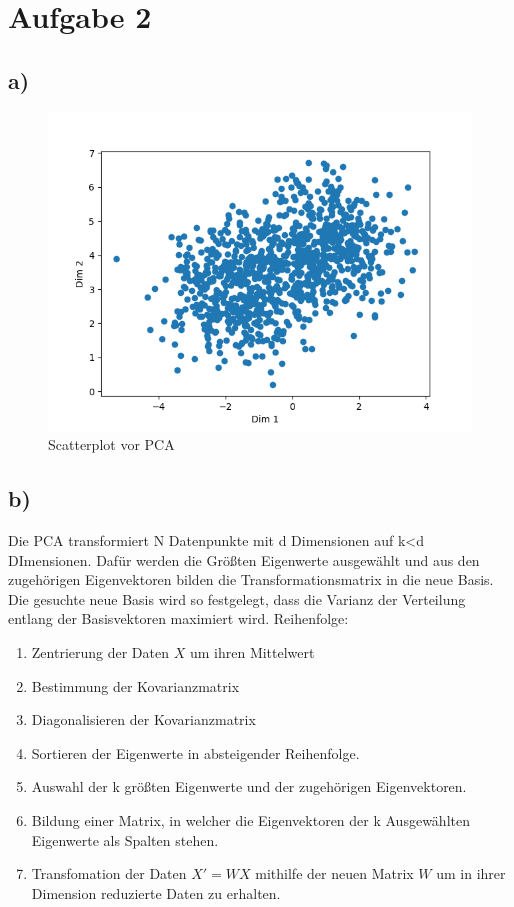 \section{Aufgabe 2}
\label{sec:Aufgabe2}
% 
\subsection{a)}
\begin{figure}[H]
  \centering
  \includegraphics{plots/scatterplot_a.png}
  \caption{Scatterplot vor PCA}
  \label{fig:scatterplot}
\end{figure}
\subsection{b)}
Die PCA transformiert N Datenpunkte mit d Dimensionen auf k<d DImensionen.
Dafür werden die Größten Eigenwerte ausgewählt und aus den zugehörigen Eigenvektoren bilden die Transformationsmatrix in die neue Basis.
Die gesuchte neue Basis wird so festgelegt, dass die Varianz der Verteilung entlang der Basisvektoren maximiert wird.
Reihenfolge:
\begin{enumerate}
  \item Zentrierung der Daten $X$ um ihren Mittelwert
  \item Bestimmung der Kovarianzmatrix
  \item Diagonalisieren der Kovarianzmatrix
  \item Sortieren der Eigenwerte in absteigender Reihenfolge.
  \item Auswahl der k größten Eigenwerte und der zugehörigen Eigenvektoren.
  \item Bildung einer Matrix, in welcher die Eigenvektoren der k Ausgewählten Eigenwerte als Spalten stehen.
  \item Transfomation der Daten $X' = W X$ mithilfe der neuen Matrix $W$ um in ihrer Dimension reduzierte Daten zu erhalten.
\end{enumerate}

